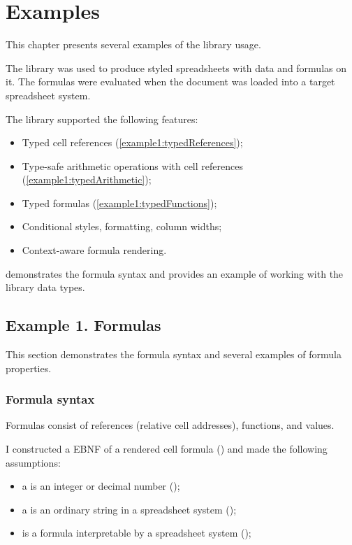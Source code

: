 


\chapter{Examples}
\label{chap:impl}

This chapter presents several examples of the \clerk library usage.

The library was used to produce styled spreadsheets with data and formulas on it. The formulas were evaluated when the document was loaded into a target spreadsheet system.

The library supported the following features:

\begin{itemize}
  \item Typed cell references (\cref{example1:typedReferences});
  \item Type-safe arithmetic operations with cell references (\cref{example1:typedArithmetic});
  \item Typed formulas (\cref{example1:typedFunctions});
  \item Conditional styles, formatting, column widths;
  \item Context-aware formula rendering.
\end{itemize}

 demonstrates the formula syntax and  provides an example of working with the library data types.

\section{Example 1. Formulas}
\label{sec:ex1}

This section demonstrates the formula syntax and several examples of formula properties.

\subsection{Formula syntax}

Formulas consist of references (relative cell addresses), functions, and values.

I constructed a EBNF of a rendered cell formula () and made the following assumptions:

\begin{itemize}
  \item a  is an integer or decimal number ();
  \item a  is an ordinary string in a spreadsheet system ();
  \item {} is a formula interpretable by a spreadsheet system ();
\end{itemize}


